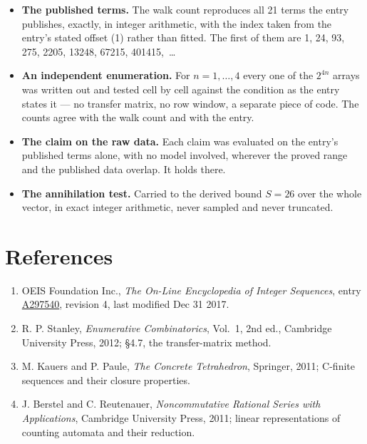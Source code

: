 \documentclass[11pt]{article}
\theoremstyle{definition}
\begin{document}
\begin{itemize}

\item {\bfseries The published terms.} The walk count reproduces all 21 terms the entry publishes, exactly, in integer arithmetic, with the index taken from the entry's stated offset (1) rather than fitted. The first of them are 1, 24, 93, 275, 2205, 13248, 67215, 401415,~\dots

\item {\bfseries An independent enumeration.} For $n = 1,\dots,4$ every one of the $2^{4n}$ arrays was written out and tested cell by cell against the condition as the entry states it --- no transfer matrix, no row window, a separate piece of code. The counts agree with the walk count and with the entry.

\item {\bfseries The claim on the raw data.} Each claim was evaluated on the entry's published terms alone, with no model involved, wherever the proved range and the published data overlap. It holds there.

\item {\bfseries The annihilation test.} Carried to the derived bound $S = 26$ over the whole vector, in exact integer arithmetic, never sampled and never truncated.

\end{itemize}

\section{References}

\begin{enumerate}

\item OEIS Foundation Inc., \emph{The On-Line Encyclopedia of Integer Sequences}, entry \href{https://oeis.org/A297540}{A297540}, revision 4, last modified Dec 31 2017.

\item R. P. Stanley, \emph{Enumerative Combinatorics}, Vol.~1, 2nd ed., Cambridge University Press, 2012; \S4.7, the transfer-matrix method.

\item M. Kauers and P. Paule, \emph{The Concrete Tetrahedron}, Springer, 2011; C-finite sequences and their closure properties.

\item J. Berstel and C. Reutenauer, \emph{Noncommutative Rational Series with Applications}, Cambridge University Press, 2011; linear representations of counting automata and their reduction.

\end{enumerate}
\end{document}
